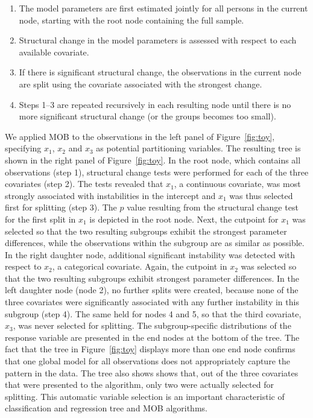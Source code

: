 \documentclass[doc,floatsintext,natbib]{apa7}
\begin{document}
\begin{enumerate}
\setlength\itemsep{0.25em}
\item The model parameters are first estimated jointly for all persons in the current node, starting with the root node containing the full sample.
\item Structural change in the model parameters is assessed with respect to each available covariate.
\item If there is significant structural change, the observations in the current node are split using the covariate associated with the strongest change.
\item Steps 1--3 are repeated recursively in each resulting node until there is no more significant structural change (or the groups becomes too small).
\end{enumerate}

We applied MOB to the observations in the left panel of Figure~\ref{fig:toy}, specifying $x_1$, $x_2$ and $x_3$ as potential partitioning variables. The resulting tree is shown in the right panel of Figure~\ref{fig:toy}. In the root node, which contains all observations (step 1), structural change tests were performed for each of the three covariates (step 2). The tests revealed that $x_1$, a continuous covariate, was most strongly associated with instabilities in the intercept and $x_1$ was thus selected first for splitting (step 3). The $p$ value resulting from the structural change test for the first split in $x_1$ is depicted in the root node. Next, the cutpoint for $x_1$ was selected so that the two resulting subgroups exhibit the strongest parameter differences, while the observations within the subgroup are as similar as possible. In the right daughter node, additional significant instability was detected with respect to $x_2$, a categorical covariate. Again, the cutpoint in $x_2$ was selected so that the two resulting subgroups exhibit strongest parameter differences. In the left daughter node (node 2), no further splits were created, because none of the three covariates were significantly associated with any further instability in this subgroup (step 4). The same held for nodes 4 and 5, so that the third covariate, $x_3$, was never selected for splitting. The subgroup-specific distributions of the response variable are presented in the end nodes at the bottom of the tree.
The fact that the tree in Figure~\ref{fig:toy} displays more than one end node confirms that one global model for all observations does not appropriately capture the pattern in the data. 
The tree also shows shows that, out of the three covariates that were presented to the algorithm, only two were actually selected for splitting. This automatic variable selection is an important characteristic of classification and regression tree and MOB algorithms. 
\end{document}
